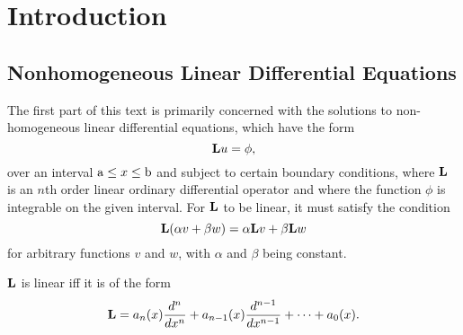 \section{Introduction}
\subsection{Nonhomogeneous Linear Differential Equations}
The first part of this text is primarily concerned with the solutions to non-homogeneous linear differential equations, which have the form
\begin{equation}
    \mathrm{\bf{L}} u=\phi,
\end{equation}
over an interval \(\mathrm{a} \leq x \leq \mathrm{b}\) and subject to certain boundary conditions, where \(\mathrm{\bf{L}}\) is an \(n\)th order linear ordinary differential operator and where the function \(\phi\) is integrable on the given interval. For \(\mathrm{\bf{L}}\) to be linear, it must satisfy the condition
\begin{equation}\label{eq:linearity}
	\mathrm{\bf{L}}(\alpha v + \beta w) = \alpha \mathrm{\bf{L}} v + \beta \mathrm{\bf{L}} w
\end{equation}
for arbitrary functions \(v\) and \(w\), with \(\alpha\) and \(\beta\) being constant. 


\begin{theorem}
	\(\mathrm{\bf{L}}\) is linear iff it is of the form
	\begin{equation} 
		\mathrm{\bf{L}} = a_n(x) \frac{d^n}{dx^n} + a_{n-1}(x) \frac{d^{n-1}}{dx^{n-1}} + \cdots + a_0(x).
	\end{equation}
\end{theorem}

